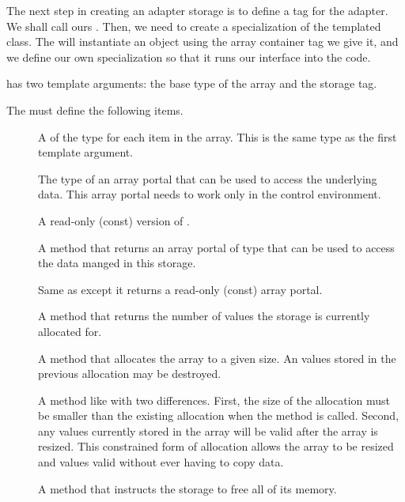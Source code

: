 
The next step in creating an adapter storage is to define a tag for the
adapter. We shall call ours
. Then, we need to create a
specialization of the templated 
class. The  will instantiate an object using
the array container tag we give it, and we define our own specialization so
that it runs our interface into the code.

 has two template arguments: the
base type of the array and the storage tag.


The  must define the following items.
\begin{description}
\item[] A  of the type for each item
  in the array. This is the same type as the first template argument.
\item[] The type of an array portal that can be used
  to access the underlying data. This array portal needs to work only in
  the control environment.
\item[] A read-only (const) version of
  .
\item[] A method that returns an array portal of type
   that can be used to access the data manged in this
  storage.
\item[] Same as  except it
  returns a read-only (const) array portal.
\item[] A method that returns the number of
  values the storage is currently allocated for.
\item[] A method that allocates the array to a given
  size. An values stored in the previous allocation may be destroyed.
\item[] A method like  with two
  differences. First, the size of the allocation must be smaller than the
  existing allocation when the method is called. Second, any values
  currently stored in the array will be valid after the array is
  resized. This constrained form of allocation allows the array to be
  resized and values valid without ever having to copy data.
\item[] A method that instructs the storage to
  free all of its memory.
\end{description}

